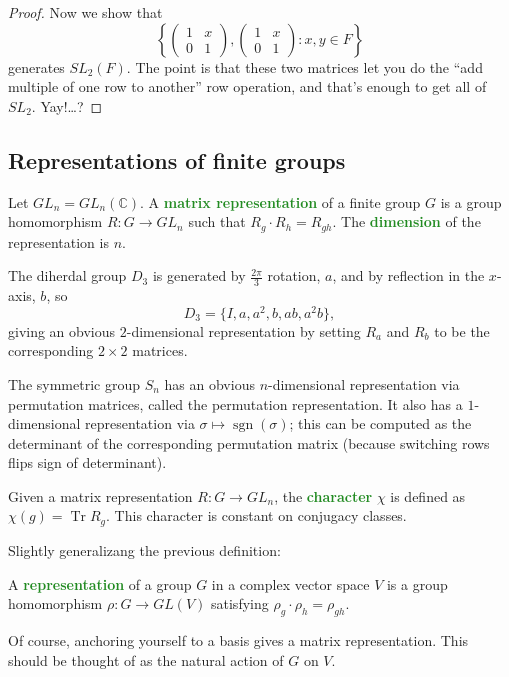 \documentclass[10pt]{scrartcl}
\providecommand{\CC}{\mathbb C}
\providecommand{\opname}{\operatorname}
\providecommand{\vocab}[1]{{\textbf{\textcolor{ForestGreen}{#1}}}}
\begin{document}
\begin{proof}
	Now we show that
	\[\left\{\begin{pmatrix}
		1&x\\0&1
	\end{pmatrix},
	\begin{pmatrix}
		1&x\\0&1
	\end{pmatrix} : x,y\in F\right\}\]
	generates $SL_2(F)$. The point is that these two matrices
	let you do the ``add multiple of one row to another''
	row operation, and that's enough to get all of $SL_2$.
	Yay!\dots?
\end{proof}

\subsection{Representations of finite groups}
\begin{definition}
	Let $GL_n = GL_n(\CC)$. A \vocab{matrix representation}
	of a finite group $G$ is a group homomorphism $R\colon G\to GL_n$
	such that $R_g\cdot R_h = R_{gh}$.
	The \vocab{dimension} of the representation is $n$.
\end{definition}

\begin{example}
	The diherdal group $D_3$ is generated by $\frac{2\pi}3$ rotation, $a$,
	and by reflection in the $x$-axis, $b$, so
	\[D_3 = \{I, a, a^2, b, ab, a^2b\},\]
	giving an obvious $2$-dimensional representation by setting
	$R_a$ and $R_b$ to be the corresponding $2\times 2$ matrices.
\end{example}

\begin{example}
	The symmetric group $S_n$ has an obvious $n$-dimensional representation
	via permutation matrices, called the permutation representation.
	It also has a $1$-dimensional representation via
	$\sigma\mapsto\opname{sgn}(\sigma)$;
	this can be computed as the determinant of the corresponding
	permutation matrix (because switching rows flips sign of determinant).
\end{example}

\begin{definition}
	Given a matrix representation $R\colon G\to GL_n$,
	the \vocab{character} $\chi$ is defined as $\chi(g) = \opname{Tr} R_g$.
	This character is constant on conjugacy classes.
\end{definition}

Slightly generalizang the previous definition:
\begin{definition}
	A \vocab{representation} of a group $G$ in a complex vector space
	$V$ is a group homomorphism $\rho\colon G\to GL(V)$
	satisfying $\rho_g\cdot \rho_h = \rho_{gh}$.
\end{definition}
Of course, anchoring yourself to a basis gives a matrix representation.
This should be thought of as the natural action of $G$ on $V$.
\end{document}
